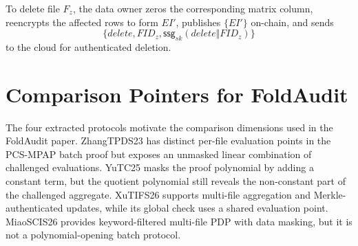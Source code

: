 \documentclass[11pt]{article}
\begin{document}
To delete file \(F_z\), the data owner zeros the corresponding matrix column,
reencrypts the affected rows to form \(EI'\), publishes \(\{EI'\}\) on-chain,
and sends
\[
    \{delete,FID_z,\mathsf{ssg}_{sk}(delete\Vert FID_z)\}
\]
to the cloud for authenticated deletion.

\section{Comparison Pointers for FoldAudit}

The four extracted protocols motivate the comparison dimensions used in the
FoldAudit paper.  ZhangTPDS23 has distinct per-file evaluation
points in the PCS-MPAP batch proof but exposes an unmasked linear combination
of challenged evaluations.  YuTC25 masks the proof polynomial by adding a
constant term, but the quotient polynomial still reveals the non-constant part
of the challenged aggregate.  XuTIFS26 supports multi-file aggregation and
Merkle-authenticated updates, while its global check uses a shared evaluation
point.  MiaoSCIS26 provides keyword-filtered multi-file PDP with data masking,
but it is not a polynomial-opening batch protocol.
\end{document}
